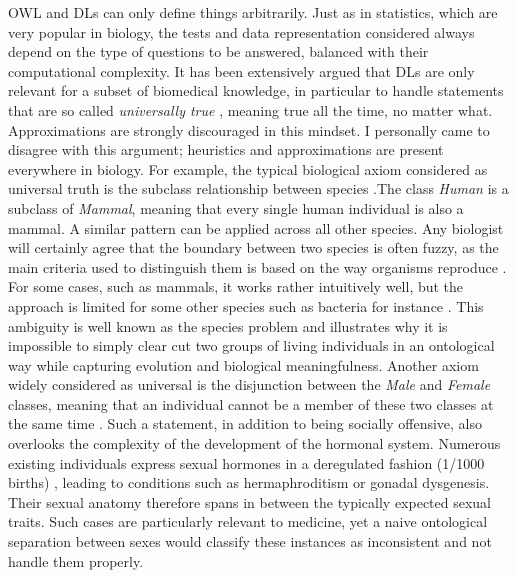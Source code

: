 OWL and DLs can only define things arbitrarily. Just as in statistics, which are very popular in biology, the tests and data representation considered always depend on the type of questions to be answered, balanced with their computational complexity. It has been extensively argued that DLs are only relevant for a subset of biomedical knowledge, in particular to handle statements that are so called \emph{universally true} \citep{schulz2013formal}, meaning true all the time, no matter what. Approximations are strongly discouraged in this mindset. I personally came to disagree with this argument; heuristics and approximations are present everywhere in biology. For example, the typical biological axiom considered as universal truth is the subclass relationship between species \citep{schulz2013formal} \citep{krotzsch2012owl}.The class \emph{Human} is a subclass of \emph{Mammal}, meaning that every single human individual is also a mammal. A similar pattern can be applied across all other species. Any biologist will certainly agree that the boundary between two species is often fuzzy, as the main criteria used to distinguish them is based on the way organisms reproduce \citep{hanage2013fuzzy}. For some cases, such as mammals, it works rather intuitively well, but the approach is limited for some other species such as bacteria for instance \citep{hanage2013fuzzy}. This ambiguity is well known as the species problem and illustrates why it is impossible to simply clear cut two groups of living individuals in an ontological way while capturing evolution and biological meaningfulness. Another axiom widely considered as universal is the disjunction between the \emph{Male} and \emph{Female} classes, meaning that an individual cannot be a member of these two classes at the same time \citep{disjointw3c}. Such a statement, in addition to being socially offensive, also overlooks the complexity of the development of the hormonal system. Numerous existing individuals express sexual hormones in a deregulated fashion (1/1000 births) \citep{dreger1998ambiguous}, leading to conditions such as hermaphroditism or gonadal dysgenesis. Their sexual anatomy therefore spans in between the typically expected sexual traits. Such cases are particularly relevant to medicine, yet a naive ontological separation between sexes would classify these instances as inconsistent and not handle them properly.

